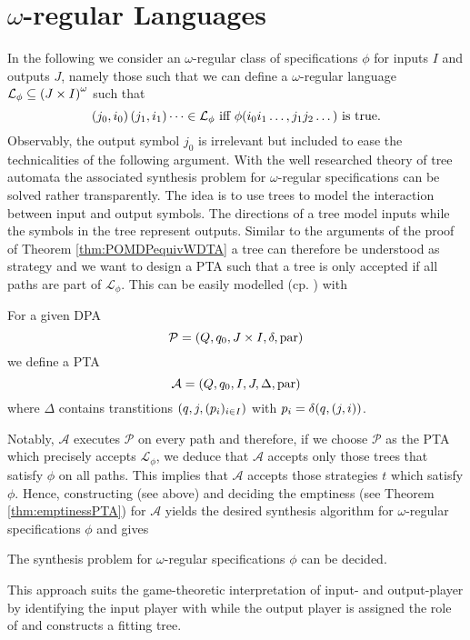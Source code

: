\section{$\omega$-regular Languages}
In the following we consider an $\omega$-regular class of specifications 
$\phi$ for inputs $I$ and outputs $J$, namely those such that we can define a 
$\omega$-regular language $\mathcal{L}_{\phi}\subseteq 
\left(J\times I\right)^{\omega}$ such that
\begin{equation*}
  \left(j_{0}, i_{0}\right)\left(j_{1}, i_{1}\right)\dots\in\mathcal{L}_{\phi}
  \text{ iff }
  \phi(i_{0}i_{1}\dots, j_{1}j_{2}\dots)\text{ is true.}
\end{equation*}
Observably, the output symbol $j_{0}$ is irrelevant but included to ease the 
technicalities of the following argument. With the well researched theory of
tree automata the associated synthesis problem for $\omega$-regular 
specifications can be solved rather transparently. The idea is to use trees to 
model the interaction between input and output symbols. The directions of a 
tree model inputs while the symbols in the tree represent outputs. Similar to 
the arguments of the proof of Theorem \ref{thm:POMDPequivWDTA} a tree can 
therefore be understood as strategy and we want to design a \ac{PTA} such that 
a tree is only accepted if all paths are part of $\mathcal{L}_{\phi}$. This can 
be easily modelled (cp. \cite[Lemma 15]{AutoInfObj}) with
\begin{definition}
  For a given \ac{DPA}
  \begin{equation*}
    \mathcal{P} = \left(Q, q_{0}, J\times I, \delta, \operatorname{par}\right)
  \end{equation*}
  we define a \ac{PTA}
  \begin{equation*}
    \mathcal{A} = \left(Q, q_{0}, I, J, \Delta, \operatorname{par}\right)
  \end{equation*}
  where $\Delta$ contains transtitions $\left(q, j, (p_{i})_{i\in I}\right)$ with
  $p_{i} = \delta(q, \left(j, i\right))$.
\end{definition}
Notably, $\mathcal{A}$ executes $\mathcal{P}$ on every path and therefore, if 
we choose $\mathcal{P}$ as the \ac{PTA} which precisely accepts 
$\mathcal{L}_{\phi}$, we deduce that $\mathcal{A}$ accepts only those trees 
that satisfy $\phi$ on all paths. This implies that $\mathcal{A}$ accepts those
strategies $t$ which satisfy $\phi$. Hence, constructing (see above) and 
deciding the emptiness (see Theorem \ref{thm:emptinessPTA}) for $\mathcal{A}$ 
yields the desired synthesis algorithm for $\omega$-regular specifications 
$\phi$ and gives
\begin{theorem}
  \cite[Theorem 21, Theorem 22]{AutoInfObj}
  The synthesis problem for $\omega$-regular specifications $\phi$ can be 
  decided.
\end{theorem}
This approach suits the game-theoretic interpretation of input- and 
output-player by identifying the input player with \pathfinder{} while the 
output player is assigned the role of \automaton{} and constructs a fitting 
tree.

